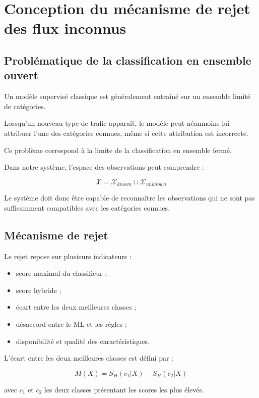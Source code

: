 \section{Conception du mécanisme de rejet des flux inconnus}

\subsection{Problématique de la classification en ensemble ouvert}

Un modèle supervisé classique est généralement entraîné
sur un ensemble limité de catégories.

Lorsqu'un nouveau type de trafic apparaît, le modèle
peut néanmoins lui attribuer l'une des catégories
connues, même si cette attribution est incorrecte.

Ce problème correspond à la limite de la classification
en ensemble fermé.

Dans notre système, l'espace des observations peut
comprendre :

\[
\mathcal{X}=
\mathcal{X}_{known}
\cup
\mathcal{X}_{unknown}
\]

Le système doit donc être capable de reconnaître
les observations qui ne sont pas suffisamment
compatibles avec les catégories connues.

\subsection{Mécanisme de rejet}

Le rejet repose sur plusieurs indicateurs :

\begin{itemize}
    \item score maximal du classifieur ;
    \item score hybride ;
    \item écart entre les deux meilleures classes ;
    \item désaccord entre le ML et les règles ;
    \item disponibilité et qualité des caractéristiques.
\end{itemize}

L'écart entre les deux meilleures classes est défini par :

\[
M(X)=S_H(c_1|X)-S_H(c_2|X)
\]

avec $c_1$ et $c_2$ les deux classes présentant
les scores les plus élevés.

